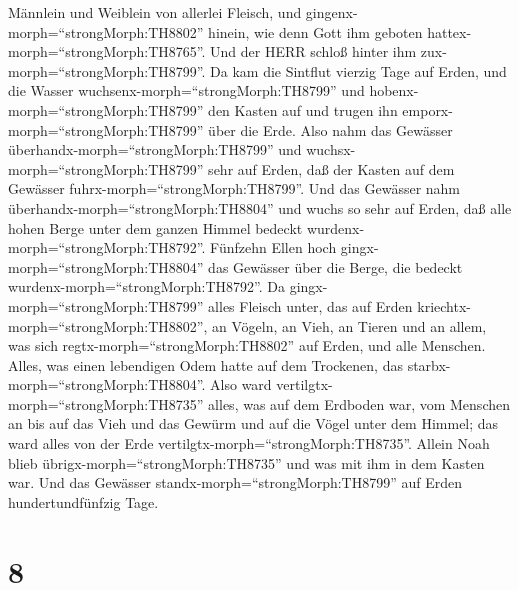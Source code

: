 Männlein und Weiblein von allerlei Fleisch, und
gingenx-morph=``strongMorph:TH8802'' hinein, wie denn Gott ihm geboten
hattex-morph=``strongMorph:TH8765''. Und der HERR schloß hinter ihm
zux-morph=``strongMorph:TH8799''.  Da kam die Sintflut
vierzig Tage auf Erden, und die Wasser
wuchsenx-morph=``strongMorph:TH8799'' und
hobenx-morph=``strongMorph:TH8799'' den Kasten auf und trugen ihn
emporx-morph=``strongMorph:TH8799'' über die Erde.  Also
nahm das Gewässer überhandx-morph=``strongMorph:TH8799'' und
wuchsx-morph=``strongMorph:TH8799'' sehr auf Erden, daß der Kasten auf
dem Gewässer fuhrx-morph=``strongMorph:TH8799''.  Und das
Gewässer nahm überhandx-morph=``strongMorph:TH8804'' und wuchs so sehr
auf Erden, daß alle hohen Berge unter dem ganzen Himmel bedeckt
wurdenx-morph=``strongMorph:TH8792''.  Fünfzehn Ellen hoch
gingx-morph=``strongMorph:TH8804'' das Gewässer über die Berge, die
bedeckt wurdenx-morph=``strongMorph:TH8792''.  Da
gingx-morph=``strongMorph:TH8799'' alles Fleisch unter, das auf Erden
kriechtx-morph=``strongMorph:TH8802'', an Vögeln, an Vieh, an Tieren und
an allem, was sich regtx-morph=``strongMorph:TH8802'' auf Erden, und
alle Menschen.  Alles, was einen lebendigen Odem hatte auf
dem Trockenen, das starbx-morph=``strongMorph:TH8804''. 
Also ward vertilgtx-morph=``strongMorph:TH8735'' alles, was auf dem
Erdboden war, vom Menschen an bis auf das Vieh und das Gewürm und auf
die Vögel unter dem Himmel; das ward alles von der Erde
vertilgtx-morph=``strongMorph:TH8735''. Allein Noah blieb
übrigx-morph=``strongMorph:TH8735'' und was mit ihm in dem Kasten war.
 Und das Gewässer standx-morph=``strongMorph:TH8799'' auf
Erden hundertundfünfzig Tage.

\hypertarget{section-7}{%
\section{8}\label{section-7}}

